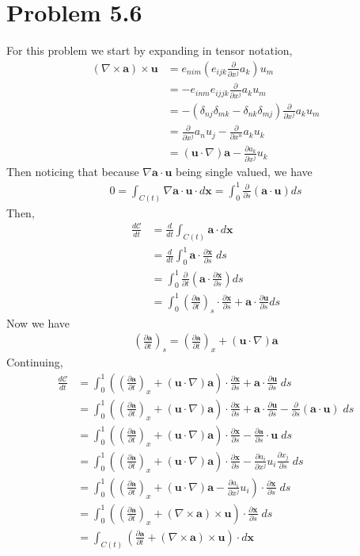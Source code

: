 \documentclass[12pt]{article}
\newcommand{\eq}[1]{\begin{align*}#1\end{align*}}
\newcommand{\p}[2]{\frac{\partial#1}{\partial#2}}
\newcommand{\de}[2]{\frac{d#1}{d#2}}
\begin{document}
\section*{Problem 5.6}
For this problem we start by expanding in tensor notation,
\eq{
	(\nabla\times\bm{a})\times\bm{u} &= e_{nim}(e_{ijk}\p{}{x^j}a_k)u_m\\
	&= -e_{inm}e_{ijjk}\p{}{x^j}a_ku_m\\
	&= -(\delta_{nj}\delta_{mk} - \delta_{nk}\delta_{mj}) \p{}{x^j}a_ku_m\\
	&= \p{}{x^j}a_nu_j - \p{}{x^n}a_ku_k\\
	&= (\bm{u}\cdot\nabla)\bm{a} - \p{a_k}{x^j}u_k
}
Then noticing that because $\nabla \bm{a}\cdot\bm{u}$ being single valued, we have
\eq{
	0 = \int_{C(t)} \nabla \bm{a}\cdot\bm{u}\cdot d\bm{x} = \int_0^1 \p{}{s}(\bm{a}\cdot\bm{u})ds
}
Then,
\eq{
	\de{\mathcal{C}}{t} &= \de{}{t} \int_{C(t)} \bm{a}\cdot d\bm{x}\\
	&= \de{}{t} \int_0^1 \bm{a}\cdot \p{\bm{x}}{s}\;ds\\
	&= \int_0^1 \p{}{t}\left(\bm{a}\cdot\p{\bm{x}}{s}\right)ds\\
	&= \int_0^1 \left(\p{\bm{a}}{t}\right)_s\cdot\p{\bm{x}}{s} + \bm{a}\cdot\p{\bm{u}}{s}ds
}
Now we have
\eq{
	\left(\p{\bm{a}}{t}\right)_s = \left(\p{\bm{a}}{t}\right)_x + (\bm{u}\cdot\nabla)\bm{a}
}
Continuing,
\eq{
	\de{\mathcal{C}}{t} &= \int_0^1 \left( \left(\p{\bm{a}}{t}\right)_x + (\bm{u}\cdot\nabla)\bm{a}\right)\cdot\p{\bm{x}}{s} + \bm{a}\cdot\p{\bm{u}}{s}\;ds\\
	&= \int_0^1 \left( \left(\p{\bm{a}}{t}\right)_x + (\bm{u}\cdot\nabla)\bm{a}\right)\cdot\p{\bm{x}}{s} + \bm{a}\cdot\p{\bm{u}}{s} - \p{}{s}(\bm{a}\cdot\bm{u})\;ds\\
	&= \int_0^1 \left( \left(\p{\bm{a}}{t}\right)_x + (\bm{u}\cdot\nabla)\bm{a}\right)\cdot\p{\bm{x}}{s} - \p{\bm{a}}{s}\cdot\bm{u}\;ds\\
	&= \int_0^1 \left( \left(\p{\bm{a}}{t}\right)_x + (\bm{u}\cdot\nabla)\bm{a}\right)\cdot\p{\bm{x}}{s} - \p{a_i}{x^j}u_i\p{x_j}{s}\;ds\\
	&= \int_0^1 \left( \left(\p{\bm{a}}{t}\right)_x + (\bm{u}\cdot\nabla)\bm{a} - \p{a_i}{x^j}u_i\right)\cdot\p{\bm{x}}{s}\;ds\\
	&= \int_0^1 \left( \left(\p{\bm{a}}{t}\right)_x + (\nabla\times\bm{a})\times\bm{u}\right)\cdot\p{\bm{x}}{s}\;ds\\
	&= \int_{C(t)} \left(\p{\bm{a}}{t} + (\nabla\times\bm{a})\times\bm{u}\right)\cdot d\bm{x}
}
\end{document}
